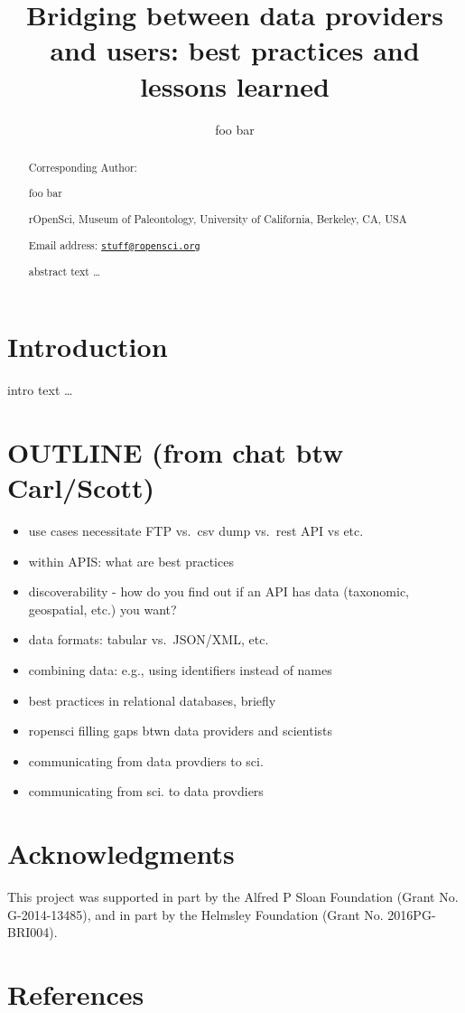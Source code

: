 \documentclass[author-year, review, 11pt]{components/elsarticle} %
\def\tightlist{}
\begin{document}
\begin{frontmatter}

  \title{Bridging between data providers and users: best practices and lessons
learned}
    \author[cstar]{foo bar}
      \address[cstar]{rOpenSci, Museum of Paleontology, University of California, Berkeley,
CA, USA}
  
  \begin{abstract}
  Corresponding Author:
  
  foo bar
  
  rOpenSci, Museum of Paleontology, University of California, Berkeley,
  CA, USA
  
  Email address:
  \href{mailto:stuff@ropensci.org}{\nolinkurl{stuff@ropensci.org}}
  
  \newpage
  
  abstract text \ldots{}
  \end{abstract}
  
 \end{frontmatter}


\newpage

\section{Introduction}\label{introduction}

intro text \ldots{}

\section{OUTLINE (from chat btw
Carl/Scott)}\label{outline-from-chat-btw-carlscott}

\begin{itemize}
\tightlist
\item
  use cases necessitate FTP vs.~csv dump vs.~rest API vs etc.
\item
  within APIS: what are best practices
\item
  discoverability - how do you find out if an API has data (taxonomic,
  geospatial, etc.) you want?
\item
  data formats: tabular vs.~JSON/XML, etc.
\item
  combining data: e.g., using identifiers instead of names
\item
  best practices in relational databases, briefly
\item
  ropensci filling gaps btwn data providers and scientists
\item
  communicating from data provdiers to sci.
\item
  communicating from sci. to data provdiers
\end{itemize}

\section{Acknowledgments}\label{acknowledgments}

This project was supported in part by the Alfred P Sloan Foundation
(Grant No. G-2014-13485), and in part by the Helmsley Foundation (Grant
No. 2016PG-BRI004).

\section{References}\label{references}
\end{document}
